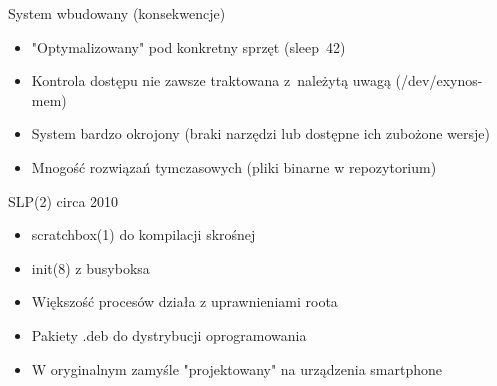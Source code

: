 \documentclass[presentation,aspectratio=43,12pt]{beamer}
\begin{document}
\begin{frame}[label=sec-2-5]{System wbudowany (konsekwencje)}
\begin{itemize}
\item "Optymalizowany" pod konkretny sprzęt (sleep~42)

\item <2-> Kontrola dostępu nie zawsze traktowana z~należytą uwagą
(/dev/exynos-mem)

\item <3-> System bardzo okrojony (braki narzędzi lub dostępne ich
zubożone wersje)

\item <4-> Mnogość rozwiązań tymczasowych (pliki binarne w
repozytorium)
\end{itemize}


\end{frame}


\begin{frame}[label=sec-2-6]{SLP(2) circa 2010}
\begin{itemize}
\item scratchbox(1) do kompilacji skrośnej
\item init(8) z busyboksa
\item Większość procesów działa z uprawnieniami roota
\item Pakiety .deb do dystrybucji oprogramowania
\end{itemize}


\begin{itemize}
\item W oryginalnym zamyśle "projektowany" na urządzenia smartphone
\end{itemize}

\end{frame}
\end{document}
